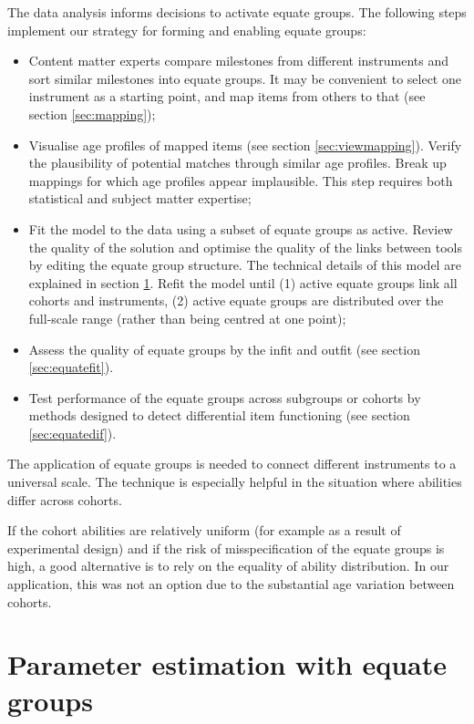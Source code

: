 \documentclass[
]{book}
\providecommand{\tightlist}{%
  \setlength{\itemsep}{0pt}\setlength{\parskip}{0pt}}
\begin{document}
The data analysis informs decisions to activate equate groups. The following steps implement our strategy for forming and enabling equate groups:

\begin{itemize}
\tightlist
\item
  Content matter experts compare milestones from different instruments and sort similar milestones into equate groups. It may be convenient to select one instrument as a starting point, and map items from others to that (see section \ref{sec:mapping});
\item
  Visualise age profiles of mapped items (see section \ref{sec:viewmapping}). Verify the plausibility of potential matches through similar age profiles. Break up mappings for which age profiles appear implausible. This step requires both statistical and subject matter expertise;
\item
  Fit the model to the data using a subset of equate groups as active. Review the quality of the solution and optimise the quality of the links between tools by editing the equate group structure. The technical details of this model are explained in section \ref{sec:statisticalframe}. Refit the model until (1) active equate groups link all cohorts and instruments, (2) active equate groups are distributed over the full-scale range (rather than being centred at one point);
\item
  Assess the quality of equate groups by the infit and outfit (see section \ref{sec:equatefit}).
\item
  Test performance of the equate groups across subgroups or cohorts by methods designed to detect differential item functioning (see section \ref{sec:equatedif}).
\end{itemize}

The application of equate groups is needed to connect different instruments to a universal scale. The technique is especially helpful in the situation where abilities differ across cohorts.

If the cohort abilities are relatively uniform (for example as a result of experimental design) and if the risk of misspecification of the equate groups is high, a good alternative is to rely on the equality of ability distribution. In our application, this was not an option due to the substantial age variation between cohorts.

\hypertarget{sec:statisticalframe}{%
\section{Parameter estimation with equate groups}\label{sec:statisticalframe}}
\end{document}
